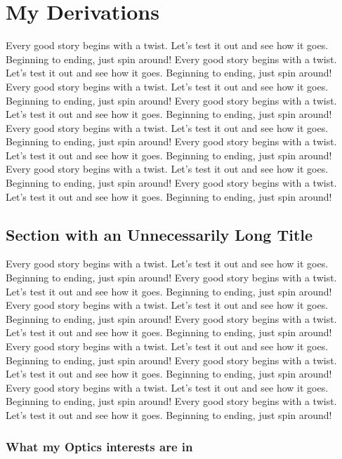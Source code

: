 \chapter{My Derivations}

Every good story begins with a twist. Let's test it out and see how it goes. Beginning to ending, just spin around! Every good story begins with a twist. Let's test it out and see how it goes. Beginning to ending, just spin around! Every good story begins with a twist. Let's test it out and see how it goes. Beginning to ending, just spin around! Every good story begins with a twist. Let's test it out and see how it goes. Beginning to ending, just spin around! Every good story begins with a twist. Let's test it out and see how it goes. Beginning to ending, just spin around! Every good story begins with a twist. Let's test it out and see how it goes. Beginning to ending, just spin around! Every good story begins with a twist. Let's test it out and see how it goes. Beginning to ending, just spin around! Every good story begins with a twist. Let's test it out and see how it goes. Beginning to ending, just spin around!

\section[What my Optics Studies have been]{Section with an Unnecessarily Long Title}

Every good story begins with a twist. Let's test it out and see how it goes. Beginning to ending, just spin around! Every good story begins with a twist. Let's test it out and see how it goes. Beginning to ending, just spin around! Every good story begins with a twist. Let's test it out and see how it goes. Beginning to ending, just spin around! Every good story begins with a twist. Let's test it out and see how it goes. Beginning to ending, just spin around! Every good story begins with a twist. Let's test it out and see how it goes. Beginning to ending, just spin around! Every good story begins with a twist. Let's test it out and see how it goes. Beginning to ending, just spin around! Every good story begins with a twist. Let's test it out and see how it goes. Beginning to ending, just spin around! Every good story begins with a twist. Let's test it out and see how it goes. Beginning to ending, just spin around!

\subsection{What my Optics interests are in}


